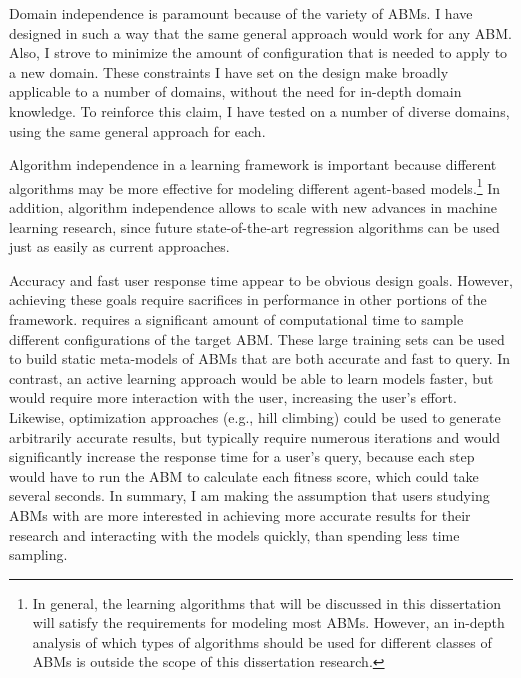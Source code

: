 Domain independence is paramount because of the variety of ABMs.
I have designed \fw in such a way that the same general approach would work for any ABM.
Also, I strove to minimize the amount of configuration that is needed to apply \fw to a new domain.
These constraints I have set on the design make \fw broadly applicable to a number of domains, without the need for in-depth domain knowledge.
To reinforce this claim, I have tested \fw on a number of diverse domains, using the same general approach for each.

Algorithm independence in a learning framework is important because different algorithms may be more effective for modeling different agent-based models.\footnote{In general, the learning algorithms that will be discussed in this dissertation will satisfy the requirements for modeling most ABMs.
However, an in-depth analysis of which types of algorithms should be used for different classes of ABMs is outside the scope of this dissertation research.}
In addition, algorithm independence allows \fw to scale with new advances in machine learning research, since future state-of-the-art regression algorithms can be used just as easily as current approaches.

Accuracy and fast user response time appear to be obvious design goals.
However, achieving these goals require sacrifices in performance in other portions of the framework.
\fw requires a significant amount of computational time to sample different configurations of the target ABM.
These large training sets can be used to build static meta-models of ABMs that are both accurate and fast to query.
In contrast, an active learning approach would be able to learn models faster, but would require more interaction with the user, increasing the user's effort.
Likewise, optimization approaches (e.g., hill climbing) could be used to generate arbitrarily accurate results, but typically require numerous iterations and would significantly increase the response time for a user's query, because each step would have to run the ABM to calculate each fitness score, which could take several seconds.
In summary, I am making the assumption that users studying ABMs with \fw are more interested in achieving more accurate results for their research and interacting with the models quickly, than spending less time sampling.


